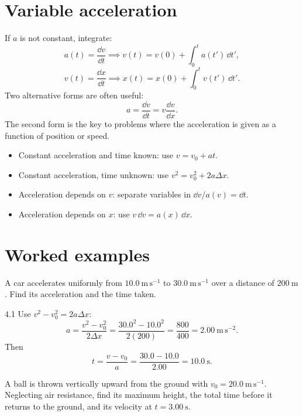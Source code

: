 \section{Variable acceleration}

If $a$ is not constant, integrate:
\[
a(t)=\frac{\dd v}{\dd t}\implies v(t)=v(0)+\int_0^t a(t')\,\dd t',
\]
\[
v(t)=\frac{\dd x}{\dd t}\implies x(t)=x(0)+\int_0^t v(t')\,\dd t'.
\]
Two alternative forms are often useful:
\[
a=\frac{\dd v}{\dd t}=v\frac{\dd v}{\dd x}.
\]
The second form is the key to problems where the acceleration is given as a
function of position or speed.

\begin{method}
\begin{itemize}[leftmargin=1.3em,itemsep=2pt]
  \item Constant acceleration and time known: use $v=v_0+at$.
  \item Constant acceleration, time unknown: use $v^2=v_0^2+2a\Delta x$.
  \item Acceleration depends on $v$: separate variables in $\dd v/a(v)=\dd t$.
  \item Acceleration depends on $x$: use $v\,\dd v=a(x)\,\dd x$.
\end{itemize}
\end{method}

\section{Worked examples}

\begin{worked}
A car accelerates uniformly from $10.0\ \mathrm{m\,s^{-1}}$ to
$30.0\ \mathrm{m\,s^{-1}}$ over a distance of $200\ \mathrm{m}$. Find its
acceleration and the time taken.
\end{worked}

\begin{solution}{4.1}
Use $v^2-v_0^2=2a\Delta x$:
\[
a=\frac{v^2-v_0^2}{2\Delta x}
=\frac{30.0^2-10.0^2}{2(200)}
=\frac{800}{400}=2.00\ \mathrm{m\,s^{-2}}.
\]
Then
\[
t=\frac{v-v_0}{a}=\frac{30.0-10.0}{2.00}=10.0\ \mathrm{s}.
\]
\end{solution}

\begin{worked}
A ball is thrown vertically upward from the ground with
$v_0=20.0\ \mathrm{m\,s^{-1}}$. Neglecting air resistance, find its maximum
height, the total time before it returns to the ground, and its velocity at
$t=3.00\ \mathrm{s}$.
\end{worked}


